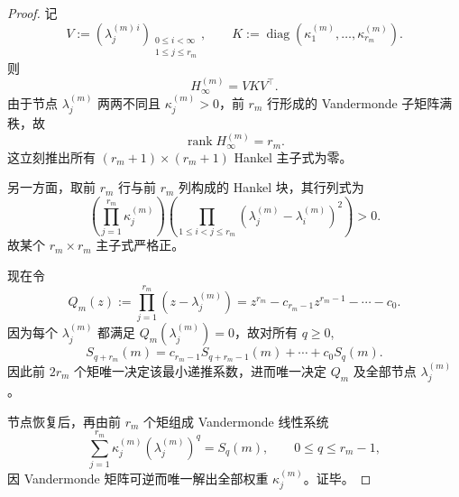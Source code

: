 \begin{proof}
记
\[
V:=(\lambda_j^{(m)\,i})_{\substack{0\le i<\infty\\1\le j\le r_m}},
\qquad
K:=\operatorname{diag}(\kappa_1^{(m)},\dots,\kappa_{r_m}^{(m)}).
\]
则
\[
H_\infty^{(m)}=VKV^\top.
\]
由于节点 \(\lambda_j^{(m)}\) 两两不同且 \(\kappa_j^{(m)}>0\)，前 \(r_m\) 行形成的 Vandermonde 子矩阵满秩，故
\[
\operatorname{rank}H_\infty^{(m)}=r_m.
\]
这立刻推出所有 \((r_m+1)\times (r_m+1)\) Hankel 主子式为零。

另一方面，取前 \(r_m\) 行与前 \(r_m\) 列构成的 Hankel 块，其行列式为
\[
\left(\prod_{j=1}^{r_m}\kappa_j^{(m)}\right)
\left(\prod_{1\le i<j\le r_m}(\lambda_j^{(m)}-\lambda_i^{(m)})^2\right)>0.
\]
故某个 \(r_m\times r_m\) 主子式严格正。

现在令
\[
Q_m(z):=\prod_{j=1}^{r_m}(z-\lambda_j^{(m)})
=
z^{r_m}-c_{r_m-1}z^{r_m-1}-\cdots-c_0.
\]
因为每个 \(\lambda_j^{(m)}\) 都满足 \(Q_m(\lambda_j^{(m)})=0\)，故对所有 \(q\ge 0\),
\[
S_{q+r_m}(m)=c_{r_m-1}S_{q+r_m-1}(m)+\cdots+c_0S_q(m).
\]
因此前 \(2r_m\) 个矩唯一决定该最小递推系数，进而唯一决定 \(Q_m\) 及全部节点 \(\lambda_j^{(m)}\)。

节点恢复后，再由前 \(r_m\) 个矩组成 Vandermonde 线性系统
\[
\sum_{j=1}^{r_m}\kappa_j^{(m)}(\lambda_j^{(m)})^q=S_q(m),
\qquad
0\le q\le r_m-1,
\]
因 Vandermonde 矩阵可逆而唯一解出全部权重 \(\kappa_j^{(m)}\)。证毕。
\end{proof}
